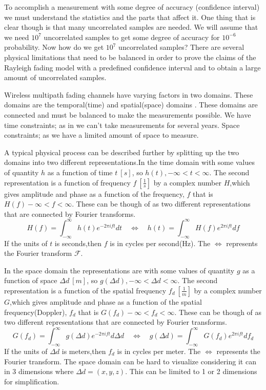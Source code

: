 To accomplish a measurement with some degree of accuracy (confidence interval) we must understand the statistics and the parts that affect it. One thing that is clear though is that many uncorrelated samples are needed. We will assume that we need $10^7$ uncorrelated samples to get some degree of accuracy for $10^{-6}$ probability. Now how do we get $10^7$ uncorrelated samples?
There are several physical limitations that need to be balanced  in order to prove the claims of the Rayleigh fading model with a predefined confidence interval and to obtain a large amount of uncorrelated samples.

Wireless multipath fading channels have varying factors in two domains. These domains are the temporal(time) and spatial(space) domains \citep[p. 40-42]{stochasticWirelessChan}. These domains are connected and must be balanced to make the measurements possible. We have time constraints; as in we can't take measurements for several years. Space constraints; as we have a limited amount of space to measure.

A typical physical process can be described further by splitting up the two domains into two different representations.In the time domain with some values of quantity $h$ as a function of time $t \ [s]$, so $h(t), -\infty < t < \infty$. The second representation is a function of frequency $f \ [\frac{1}{s}]$ by a complex number $H$,which gives amplitude and phase as a function of the frequency, $f$ that is $H(f) -\infty < f < \infty$. These can be though of as two different representations that are connected by Fourier transforms.
\begin{equation}
H(f)=\int_{- \infty}^{\infty}h(t)e^{-2\pi ift} dt \quad \Leftrightarrow \quad
h(t)=\int_{- \infty}^{\infty}H(f)e^{2\pi ift} df
\end{equation}
If the units of $t$ is seconds,then $f$ is in cycles per second(Hz). The $\Leftrightarrow$ represents the Fourier transform $\mathcal{F}$.

In the space domain the representations are with some values of quantity $g$ as a function of space $\Delta d \ [m]$, so $g(\Delta d), -\infty < \Delta d < \infty$. The second representation is a function of the spatial frequency $f_d \ [\frac{1}{m}]$ by a complex number $G$,which gives amplitude and phase as a function of the spatial frequency(Doppler), $f_d$ that is $G(f_d) -\infty < f_d < \infty$.
These can be though of as two different representations that are connected by Fourier transforms.
\begin{equation}
G(f_d)=\int_{- \infty}^{\infty}g(\Delta d)e^{-2\pi ift} d\Delta d \quad \Leftrightarrow \quad
g(\Delta d)=\int_{- \infty}^{\infty}G(f_d)e^{2\pi ift} df_d
\end{equation}
If the units of $\Delta d$ is meters,then $f_d$ is in cycles per meter. The $\Leftrightarrow$ represents the Fourier transform. The space domain can be hard to visualize considering it can in 3 dimensions where $\Delta d = (x,y,z)$. This can be limited to 1 or 2 dimensions for simplification. \citep{FTandCORR}

